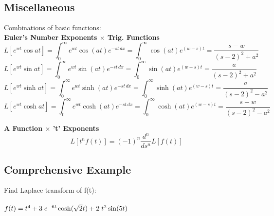 \documentclass[12pt, a4paper]{article}
\numberwithin{equation}{section}
\begin{document}
	\subsection{Miscellaneous}
	Combinations of basic functions:\\
	
	\textbf{Euler's Number Exponents $\times$ Trig. Functions}
	\begin{equation}
		L[e^{wt} \cos at] = \int_{0}^{\infty}e^{wt}\cos(at) e^{-st\,dx} = \int_{0}^{\infty}\cos(at) e^{(w - s)t} = \frac{s - w}{(s - 2)^2 + a^2}
		\label{eq_laplace_trans_trig_cos_euler}
	\end{equation}
	\begin{equation}
		L[e^{wt} \sin at] = \int_{0}^{\infty}e^{wt}\sin(at) e^{-st\,dx} = \int_{0}^{\infty}\sin(at) e^{(w - s)t} = \frac{a}{(s - 2)^2 + a^2}
		\label{eq_laplace_trans_trig_sin_euler}
	\end{equation}
	\begin{equation}
		L[e^{wt} \sinh at] = \int_{0}^{\infty}e^{wt}\sinh(at) e^{-st\,dx} = \int_{0}^{\infty}\sinh(at) e^{(w - s)t} = \frac{a}{(s - 2)^2 - a^2}
		\label{eq_laplace_trans_trig_sinh_euler}
	\end{equation}
	\begin{equation}
		L[e^{wt} \cosh at] = \int_{0}^{\infty}e^{wt}\cosh(at) e^{-st\,dx} = \int_{0}^{\infty}\cosh(at) e^{(w - s)t} = \frac{s - w}{(s - 2)^2 - a^2}
		\label{eq_laplace_trans_trig_cosh_euler}
	\end{equation}
	
	\textbf{A Function $\times$ 't' Exponents}
	\begin{equation}
		L[t^n f(t)] = (-1)^n \frac{d^n}{ds^n} L[f(t)]
		\label{eq_laplace_trans_function_t}
	\end{equation}
	
	\subsection{Comprehensive Example}
	Find Laplace transform of f(t):\\\\
	\begin{math}
		f(t) = t^4 + 3\hspace{0.1cm} e^{-6t} \cosh(\sqrt{2}t) + 2\hspace{0.1cm} t^2 \sin(5t)
	\end{math}\\
	
\end{document}
